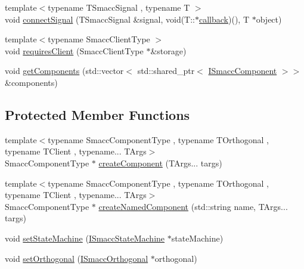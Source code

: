 \begin{DoxyCompactItemize}
\item 
{\footnotesize template$<$typename T\+Smacc\+Signal , typename T $>$ }\\void \hyperlink{classsmacc_1_1ISmaccClient_addce4ebcdebc5a7a3f80c0980862575d}{connect\+Signal} (T\+Smacc\+Signal \&signal, void(T\+::$\ast$\hyperlink{3_2servers_2opencv__perception__node_2opencv__perception__node_8cpp_a050e697bd654facce10ea3f6549669b3}{callback})(), T $\ast$object)
\item 
{\footnotesize template$<$typename Smacc\+Client\+Type $>$ }\\void \hyperlink{classsmacc_1_1ISmaccClient_a7a9990a2f3e35d547671188d69fee520}{requires\+Client} (Smacc\+Client\+Type $\ast$\&storage)
\item 
void \hyperlink{classsmacc_1_1ISmaccClient_ac6db21c1ec7072178e9f7c721908e07d}{get\+Components} (std\+::vector$<$ std\+::shared\+\_\+ptr$<$ \hyperlink{classsmacc_1_1ISmaccComponent}{I\+Smacc\+Component} $>$$>$ \&components)
\end{DoxyCompactItemize}
\subsection*{Protected Member Functions}
\begin{DoxyCompactItemize}
\item 
{\footnotesize template$<$typename Smacc\+Component\+Type , typename T\+Orthogonal , typename T\+Client , typename... T\+Args$>$ }\\Smacc\+Component\+Type $\ast$ \hyperlink{classsmacc_1_1ISmaccClient_a5c1c8eb5e91a3b399662a52cb0ca86aa}{create\+Component} (T\+Args... targs)
\item 
{\footnotesize template$<$typename Smacc\+Component\+Type , typename T\+Orthogonal , typename T\+Client , typename... T\+Args$>$ }\\Smacc\+Component\+Type $\ast$ \hyperlink{classsmacc_1_1ISmaccClient_affcc2f95bc993b5f07ef0d6ab6eec8f1}{create\+Named\+Component} (std\+::string name, T\+Args... targs)
\item 
void \hyperlink{classsmacc_1_1ISmaccClient_a28fd6ca2bcf9c5e57f3cc16fb0a076d3}{set\+State\+Machine} (\hyperlink{classsmacc_1_1ISmaccStateMachine}{I\+Smacc\+State\+Machine} $\ast$state\+Machine)
\item 
void \hyperlink{classsmacc_1_1ISmaccClient_a40330788a976dc08e2f726d210564ec4}{set\+Orthogonal} (\hyperlink{classsmacc_1_1ISmaccOrthogonal}{I\+Smacc\+Orthogonal} $\ast$orthogonal)
\end{DoxyCompactItemize}
